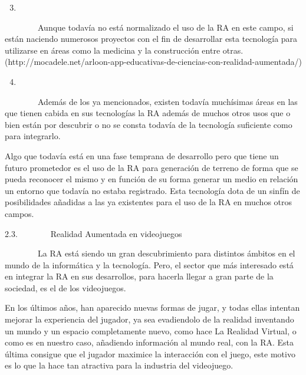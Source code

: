 \documentclass[]{article}
\begin{document}
\begin{enumerate}
\setcounter{enumi}{2}
\item
\end{enumerate}

~~~~~~~~Aunque todavía no está normalizado el uso de la RA en este
campo, si están naciendo numerosos proyectos con el fin de desarrollar
esta tecnología para utilizarse en áreas como la medicina y la
construcción entre otras.
(http://mocadele.net/arloon-app-educativas-de-ciencias-con-realidad-aumentada/)

\begin{enumerate}
\setcounter{enumi}{3}
\item
\end{enumerate}

~~~~~~~~Además de los ya mencionados, existen todavía muchísimas áreas
en las que tienen cabida en sus tecnologías la RA además de muchos otros
usos que o bien están por descubrir o no se consta todavía de la
tecnología suficiente como para integrarlo.

Algo que todavía está en una fase temprana de desarrollo pero que tiene
un futuro prometedor es el uso de la RA para generación de terreno de
forma que se pueda reconocer el mismo y en función de su forma generar
un medio en relación un entorno que todavía no estaba registrado. Esta
tecnología dota de un sinfín de posibilidades añadidas a las ya
existentes para el uso de la RA en muchos otros campos.

2.3.~~~~~~~~Realidad Aumentada en videojuegos

~~~~~~~~La RA está siendo un gran descubrimiento para distintos ámbitos
en el mundo de la informática y la tecnología. Pero, el sector que más
interesado está en integrar la RA en sus desarrollos, para hacerla
llegar a gran parte de la sociedad, es el de los videojuegos.

En los últimos años, han aparecido nuevas formas de jugar, y todas ellas
intentan mejorar la experiencia del jugador, ya sea evadiendolo de la
realidad inventando un mundo y un espacio completamente nuevo, como hace
La Realidad Virtual, o como es en nuestro caso, añadiendo información al
mundo real, con la RA. Esta última consigue que el jugador maximice la
interacción con el juego, este motivo es lo que la hace tan atractiva
para la industria del videojuego.
\end{document}
